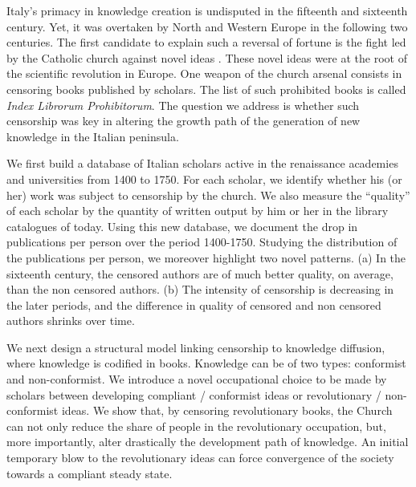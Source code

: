 \documentclass[12pt]{article}
\begin{document}

\thispagestyle{empty}
\newpage
\onehalfspacing


Italy's primacy in knowledge creation is undisputed in the fifteenth and sixteenth century. Yet, it was overtaken by North and Western Europe in the following two centuries. The first candidate to explain such a reversal of fortune is the fight led by the Catholic church against novel ideas \cite{land99}. These novel ideas were at the root of the scientific revolution in Europe. One weapon of the church arsenal consists in censoring books published by scholars. The list of such prohibited books is called {\em Index Librorum Prohibitorum}. The question we address is whether such censorship was key in altering the growth path of the generation of new knowledge in the Italian peninsula.

We first build a database of Italian scholars active in the renaissance academies and universities from 1400 to 1750. For each scholar, we identify whether his (or her) work was subject to censorship by the church. We also measure the ``quality'' of each scholar by the quantity of written output by him or her in the library catalogues of today. Using this new database, we document the drop in publications per person over the period 1400-1750.  Studying the distribution of the publications per person, we moreover highlight two  novel  patterns. (a) In the sixteenth century, the censored authors are of much better quality, on average, than the non censored authors. (b) The intensity of censorship is decreasing in the later periods, and the difference in quality of censored and non censored authors shrinks over time.

We next design a structural model linking censorship to knowledge diffusion, where knowledge is codified in books. Knowledge can be of two types: conformist and non-conformist. We introduce a novel occupational choice to be made by scholars between developing compliant / conformist ideas or revolutionary / non-conformist ideas.
We show that, by censoring revolutionary books, the Church can not only reduce the share of people in the revolutionary occupation, but, more importantly, alter drastically the development path of knowledge. An initial temporary blow to the revolutionary ideas can force convergence of the society towards a compliant steady state.
\end{document}

